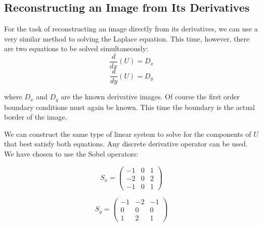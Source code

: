 \documentclass{InsightArticle}
\begin{document}
\subsection{Reconstructing an Image from Its Derivatives}
\label{sec:ReconstructingFromDerivatives}
For the task of reconstructing an image directly from its derivatives, we can use a very similar method to solving the Laplace equation. This time, however, there are two equations to be solved simultaneously:
\begin{equation}
\frac{d}{dx}(U) = D_x
\end{equation}
\begin{equation}
\frac{d}{dy}(U) = D_y
\end{equation}

where $D_x$ and $D_y$ are the known derivative images. Of course the first order boundary conditions must again be known. This time the boundary is the actual border of the image.

We can construct the same type of linear system to solve for the components of $U$ that best satisfy both equations. Any discrete derivative operator can be used. We have chosen to use the Sobel operators:

\begin{figure}[H]
  \begin{minipage}[b]{0.5\linewidth}
    \centering

    \begin{equation}
    S_x =
    \begin{pmatrix}
    -1 & 0 & 1 \\
    -2 & 0 & 2\\
    -1 & 0 & 1
    \end{pmatrix}
    \end{equation}

  \end{minipage}
    \hspace{0.5cm}
  \begin{minipage}[b]{0.5\linewidth}

    \begin{equation}
    S_y =
    \begin{pmatrix}
    -1 & -2 & -1 \\
    0 & 0 & 0\\
    1 & 2 & 1
    \end{pmatrix}
    \end{equation}

  \end{minipage}
\end{figure}
\end{document}
